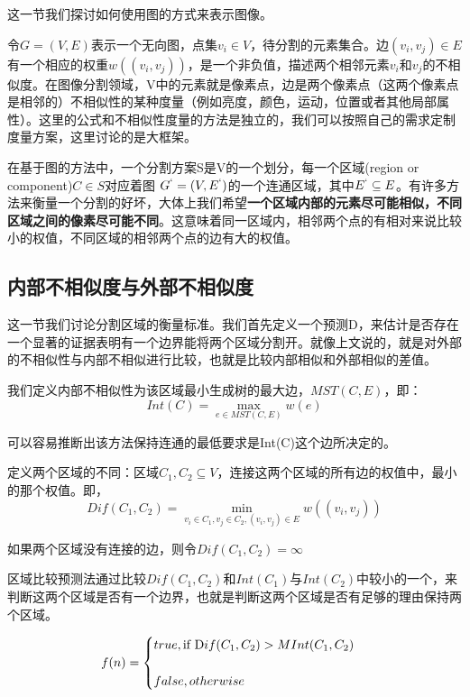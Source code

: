 这一节我们探讨如何使用图的方式来表示图像。

令\(G=(V,E)\)表示一个无向图，点集\(v_i \in V\)，待分割的元素集合。边\((v_i,v_j) \in E\)有一个相应的权重\(w((v_i,v_j))\)，是一个非负值，描述两个相邻元素\(v_i\)和\(v_j\)的不相似度。在图像分割领域，V中的元素就是像素点，边是两个像素点（这两个像素点是相邻的）不相似性的某种度量（例如亮度，颜色，运动，位置或者其他局部属性）。这里的公式和不相似性度量的方法是独立的，我们可以按照自己的需求定制度量方案，这里讨论的是大框架。

在基于图的方法中，一个分割方案S是V的一个划分，每一个区域(region or component)\(C \in S\)对应着图
\(G^` = (V,E^`)\)的一个连通区域，其中\(E^` \subseteq E\)。有许多方法来衡量一个分割的好坏，大体上我们希望\textbf{一个区域内部的元素尽可能相似，不同区域之间的像素尽可能不同}。这意味着同一区域内，相邻两个点的有相对来说比较小的权值，不同区域的相邻两个点的边有大的权值。

\subsection{内部不相似度与外部不相似度}

这一节我们讨论分割区域的衡量标准。我们首先定义一个预测D，来估计是否存在一个显著的证据表明有一个边界能将两个区域分割开。就像上文说的，就是对外部的不相似性与内部不相似进行比较，也就是比较内部相似和外部相似的差值。

我们定义内部不相似性为该区域最小生成树的最大边，\(MST(C,E)\)，即：
\begin{equation}
Int(C) = \mathop {\max }\limits_{e \in MST(C,E)}w(e)
\end{equation}

可以容易推断出该方法保持连通的最低要求是Int(C)这个边所决定的。

定义两个区域的不同：区域\(C_1,C_2 \subseteq V\)，连接这两个区域的所有边的权值中，最小的那个权值。即，
\begin{equation}
Dif(C_1,C_2) = \mathop {\min }\limits_{v_i \in C_1 ,v_j \in C_2, (v_i,v_j) \in E}w((v_i,v_j))
\end{equation}

如果两个区域没有连接的边，则令\(Dif(C_1,C_2) = \infty\)

区域比较预测法通过比较\(Dif(C_1,C_2)\)和\(Int(C_1)\)与\(Int(C_2)\)中较小的一个，来判断这两个区域是否有一个边界，也就是判断这两个区域是否有足够的理由保持两个区域。

\begin{equation}
f(n) =\begin{cases} 
true,   \mbox {if } \mbox Dif(C_1,C_2) > M Int(C_1,C_2)\\\\
false,  otherwise \end{cases}
\end{equation}

